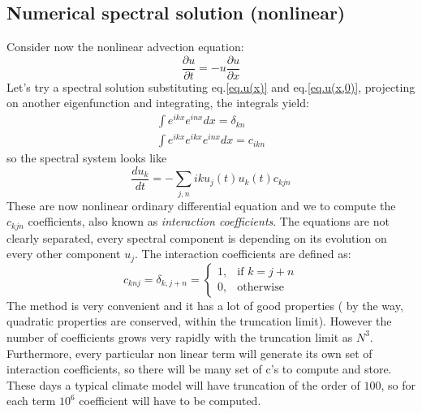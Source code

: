 \subsection{Numerical spectral solution (nonlinear)}
Consider now the nonlinear advection equation:
\begin{equation}
	\frac{\partial u}{\partial t}=-u\frac{\partial u}{\partial x}
\end{equation}
Let's try a spectral solution substituting eq.\ref{eq.u(x)} and eq.\ref{eq.u(x,0)}, projecting on another eigenfunction and integrating, the integrals yield:
\begin{align*}
	\int e^{ikx}e^{inx}dx=\delta_{kn} \\
	\int e^{ikx}e^{ikx}e^{inx}dx=c_{ikn}
\end{align*}
so the spectral system looks like
\begin{equation}\label{eq.spectral system nonlinear}
	\frac{du_k}{dt}=-\displaystyle\sum_{j,n}iku_j(t)u_k(t)c_{kjn}
\end{equation}
These are now nonlinear ordinary differential equation and we to compute the $c_{kjn}$ coefficients, also known as \textit{interaction coefficients}. The equations are not clearly separated, every spectral component is depending on its evolution on every other component $u_j$.
The interaction coefficients are defined as:
\begin{equation}
	c_{knj}=\delta_{k,j+n}=\begin{cases}
		1, & \text{if $k=j+n$} \\
		0, & \text{otherwise}
	\end{cases}
\end{equation}
The method is very convenient and it has a lot of good properties ( by the way,
quadratic properties are conserved, within the truncation limit). However the
number of coefficients grows very rapidly with the truncation limit as $N^3$.
Furthermore, every particular non linear term will generate its own set of
interaction coefficients, so there will be many set of c’s to compute and store.
These days a typical climate model will have truncation of the order of $100$, so
for each term $10^6$ coefficient will have to be computed.
\\
[5 cm]
\\
